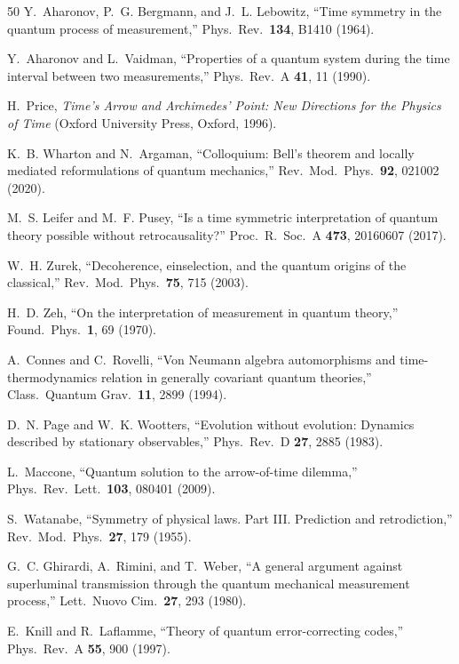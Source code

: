 \documentclass[12pt]{article}
\theoremstyle{definition}
\theoremstyle{remark}
\begin{document}
\begin{thebibliography}{50}
Y.~Aharonov, P.~G. Bergmann, and J.~L. Lebowitz,
``Time symmetry in the quantum process of measurement,''
Phys.\ Rev.\ \textbf{134}, B1410 (1964).

Y.~Aharonov and L.~Vaidman,
``Properties of a quantum system during the time interval between
two measurements,''
Phys.\ Rev.\ A \textbf{41}, 11 (1990).

H.~Price,
\emph{Time's Arrow and Archimedes' Point: New Directions for the
Physics of Time}
(Oxford University Press, Oxford, 1996).

K.~B. Wharton and N.~Argaman,
``Colloquium: Bell's theorem and locally mediated reformulations
of quantum mechanics,''
Rev.\ Mod.\ Phys.\ \textbf{92}, 021002 (2020).

M.~S. Leifer and M.~F. Pusey,
``Is a time symmetric interpretation of quantum theory possible
without retrocausality?''
Proc.\ R.\ Soc.\ A \textbf{473}, 20160607 (2017).

W.~H. Zurek,
``Decoherence, einselection, and the quantum origins of the
classical,''
Rev.\ Mod.\ Phys.\ \textbf{75}, 715 (2003).

H.~D. Zeh,
``On the interpretation of measurement in quantum theory,''
Found.\ Phys.\ \textbf{1}, 69 (1970).

A.~Connes and C.~Rovelli,
``Von Neumann algebra automorphisms and time-thermodynamics
relation in generally covariant quantum theories,''
Class.\ Quantum Grav.\ \textbf{11}, 2899 (1994).

D.~N. Page and W.~K. Wootters,
``Evolution without evolution: Dynamics described by stationary
observables,''
Phys.\ Rev.\ D \textbf{27}, 2885 (1983).

L.~Maccone,
``Quantum solution to the arrow-of-time dilemma,''
Phys.\ Rev.\ Lett.\ \textbf{103}, 080401 (2009).

S.~Watanabe,
``Symmetry of physical laws. Part III. Prediction and retrodiction,''
Rev.\ Mod.\ Phys.\ \textbf{27}, 179 (1955).

G.~C. Ghirardi, A.~Rimini, and T.~Weber,
``A general argument against superluminal transmission through the
quantum mechanical measurement process,''
Lett.\ Nuovo Cim.\ \textbf{27}, 293 (1980).

E.~Knill and R.~Laflamme,
``Theory of quantum error-correcting codes,''
Phys.\ Rev.\ A \textbf{55}, 900 (1997).


\end{thebibliography}
\end{document}
